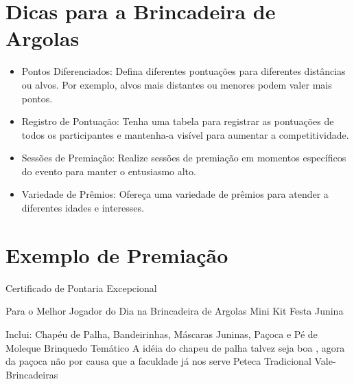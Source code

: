 \documentclass{article}
\begin{document}
\section{Dicas para a Brincadeira de Argolas}
\begin{itemize}
\item Pontos Diferenciados: Defina diferentes pontuações para diferentes distâncias ou alvos. Por exemplo, alvos mais distantes ou menores podem valer mais pontos.

\item Registro de Pontuação: Tenha uma tabela para registrar as pontuações de todos os participantes e mantenha-a visível para aumentar a competitividade.
\item Sessões de Premiação: Realize sessões de premiação em momentos específicos do evento para manter o entusiasmo alto.
\item Variedade de Prêmios: Ofereça uma variedade de prêmios para atender a diferentes idades e interesses.
\end{itemize}

\section{Exemplo de Premiação}

Certificado de Pontaria Excepcional

Para o Melhor Jogador do Dia na Brincadeira de Argolas
Mini Kit Festa Junina

Inclui: Chapéu de Palha, Bandeirinhas, Máscaras Juninas, Paçoca e Pé de Moleque
Brinquedo Temático
A idéia do chapeu de palha talvez seja boa , agora da paçoca não por causa que a faculdade já nos serve
Peteca Tradicional
Vale-Brincadeiras
\end{document}
